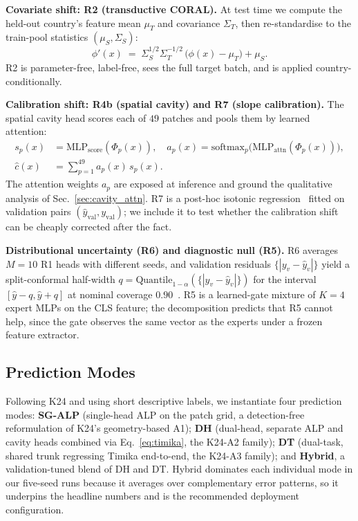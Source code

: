 \documentclass[runningheads]{llncs}
\begin{document}
\smallskip\noindent\textbf{Covariate shift: R2 (transductive CORAL).}
At test time we compute the held-out country's feature mean $\mu_T$ and covariance $\Sigma_T$, then re-standardise to the train-pool statistics $(\mu_S,\Sigma_S)$:
\begin{equation}
\phi'(x) \;=\; \Sigma_S^{1/2}\Sigma_T^{-1/2}\,\bigl(\phi(x)-\mu_T\bigr) + \mu_S.
\label{eq:coral}
\end{equation}
R2 is parameter-free, label-free, sees the full target batch, and is applied country-conditionally.

\smallskip\noindent\textbf{Calibration shift: R4b (spatial cavity) and R7 (slope calibration).}
The spatial cavity head scores each of $49$ patches and pools them by learned attention:
\begin{align}
s_p(x) &= \mathrm{MLP}_{\text{score}}(\Phi_p(x)), \quad a_p(x) = \mathrm{softmax}_p\!\bigl(\mathrm{MLP}_{\text{attn}}(\Phi_p(x))\bigr), \nonumber\\
\hat{c}(x) &= \textstyle\sum_{p=1}^{49} a_p(x)\,s_p(x).
\label{eq:spatial_cav}
\end{align}
The attention weights $a_p$ are exposed at inference and ground the qualitative analysis of Sec.~\ref{sec:cavity_attn}. R7 is a post-hoc isotonic regression~\cite{niculescu2005isotonic} fitted on validation pairs $(\hat{y}_{\text{val}},y_{\text{val}})$; we include it to test whether the calibration shift can be cheaply corrected after the fact.

\smallskip\noindent\textbf{Distributional uncertainty (R6) and diagnostic null (R5).}
R6 averages $M{=}10$ R1 heads with different seeds, and validation residuals $\{|y_v-\hat{y}_v|\}$ yield a split-conformal half-width $q=\mathrm{Quantile}_{1-\alpha}(\{|y_v-\hat{y}_v|\})$ for the interval $[\hat{y}-q,\hat{y}+q]$ at nominal coverage $0.90$~\cite{angelopoulos2023conformalintro}. R5 is a learned-gate mixture of $K{=}4$ expert MLPs on the CLS feature; the decomposition predicts that R5 cannot help, since the gate observes the same vector as the experts under a frozen feature extractor.

\subsection{Prediction Modes}
\label{sec:fusion}

Following K24 and using short descriptive labels, we instantiate four prediction modes: \textbf{SG-ALP} (single-head ALP on the patch grid, a detection-free reformulation of K24's geometry-based A1); \textbf{DH} (dual-head, separate ALP and cavity heads combined via Eq.~\ref{eq:timika}, the K24-A2 family); \textbf{DT} (dual-task, shared trunk regressing Timika end-to-end, the K24-A3 family); and \textbf{Hybrid}, a validation-tuned blend of DH and DT. Hybrid dominates each individual mode in our five-seed runs because it averages over complementary error patterns, so it underpins the headline numbers and is the recommended deployment configuration.
\end{document}
